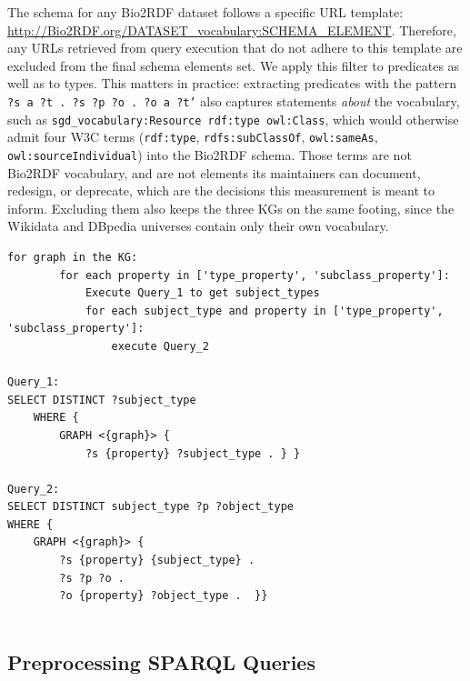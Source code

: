 \documentclass[sw]{iosart2x}
\begin{document}
The schema for any Bio2RDF dataset follows a specific URL template: \url{http://Bio2RDF.org/DATASET_vocabulary:SCHEMA_ELEMENT}. Therefore, any URLs retrieved from query execution that do not adhere to this template are excluded from the final schema elements set. We apply this filter to predicates as well as to types. This matters in practice: extracting predicates with the pattern \texttt{?s\,a\,?t\,.\ ?s\,?p\,?o\,.\ ?o\,a\,?t'} also captures statements \emph{about} the vocabulary, such as \texttt{sgd\_vocabulary:Resource\,rdf:type\,owl:Class}, which would otherwise admit four W3C terms (\texttt{rdf:type}, \texttt{rdfs:subClassOf}, \texttt{owl:sameAs}, \texttt{owl:sourceIndividual}) into the Bio2RDF schema. Those terms are not Bio2RDF vocabulary, and are not elements its maintainers can document, redesign, or deprecate, which are the decisions this measurement is meant to inform. Excluding them also keeps the three KGs on the same footing, since the Wikidata and DBpedia universes contain only their own vocabulary.


\begin{center}
\begin{minipage}{0.76\textwidth} %
\begin{lstlisting}[label={lst:l2},caption={Pseudocode to extract KG schema. KG schema extraction is consist of two queries, Query 1 and Query 2.}]
for graph in the KG:
        for each property in ['type_property', 'subclass_property']:
            Execute Query_1 to get subject_types
            for each subject_type and property in ['type_property', 'subclass_property']:
                execute Query_2 
                
Query_1:
SELECT DISTINCT ?subject_type
    WHERE {
        GRAPH <{graph}> {
            ?s {property} ?subject_type . } }

Query_2:
SELECT DISTINCT subject_type ?p ?object_type
WHERE {
    GRAPH <{graph}> {
        ?s {property} {subject_type} .
        ?s ?p ?o .
        ?o {property} ?object_type .  }} 
                    
\end{lstlisting}
\end{minipage}
\end{center}

\subsection{Preprocessing SPARQL Queries}
\end{document}
